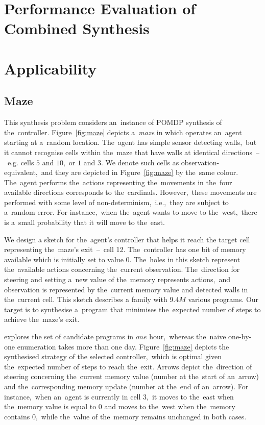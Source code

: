 \section{Performance Evaluation of Combined Synthesis}

\section{Applicability}

\subsection{Maze} 
This synthesis problem considers an~instance of POMDP synthesis of the~controller.
Figure~\ref{fig:maze} depicts a~\emph{maze} in which operates an~agent starting at a~random location.
The~agent has simple sensor detecting walls,~but it cannot recognise cells within the~maze that have walls at identical directions \,--\,~e.g. cells $5$ and $10$,~or $1$ and $3$.
We denote such cells as observation-equivalent,~and they are depicted in Figure~\ref{fig:maze} by the~same colour.
The~agent performs the~actions representing the~movements in the~four available directions corresponds to the~cardinals.
However,~these movements are performed with some level of non-determinism,~i.e.,~they are subject to a~random error.
For instance,~when the~agent wants to move to the~west,~there is a~small probability that it will move to the~east.

We design a sketch for the~agent's controller that helps it reach the target cell representing the~maze's exit \,--\, cell 12.
The~controller has one bit of memory available which is initially set to value $0$.
The~holes in this sketch represent the~available actions concerning the~current observation.
The~direction for steering and setting a~new value of the~memory represents actions,~and observation is represented by the~current memory value and detected walls in the~current cell.
This sketch describes a family with $9.4M$ various programs.
Our target is to synthesise a~program that minimises the~expected number of steps to achieve the~maze's exit.

\toolname{} explores the set of candidate programs in $one$ hour,~whereas the~naive one-by-one enumeration takes more than one day.
Figure~\ref{fig:maze} depicts the synthesised strategy of the selected controller,~which is optimal given the~expected number of steps to reach the~exit.
Arrows depict the~direction of steering concerning the~current memory value (number at the~start of an~arrow) and the~corresponding memory update (number at the~end of an~arrow).
For instance,~when an~agent is currently in cell $3$,~it moves to the~east when the~memory value is equal to $0$ and moves to the~west when the~memory contains 0,~while the~value of the~memory remains unchanged in both cases.

